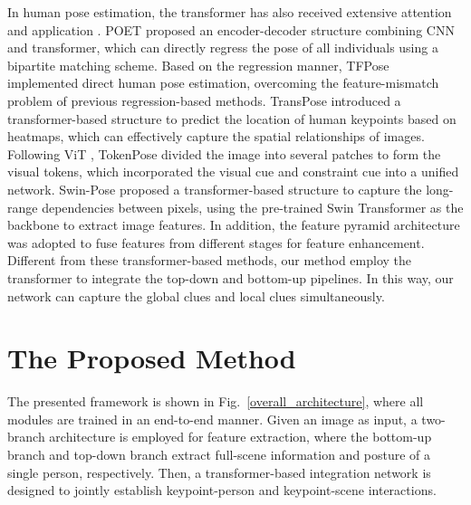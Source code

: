 \documentclass[runningheads]{llncs}
\begin{document}
In human pose estimation, the transformer has also received extensive attention and application \cite{POET2021,Tfpose2021,Transpose2021,Tokenpose2021,Swinpose2022}. POET \cite{POET2021} proposed an encoder-decoder structure combining CNN and transformer, which can directly regress the pose of all individuals using a bipartite matching scheme. Based on the regression manner, TFPose \cite{Tfpose2021} implemented direct human pose estimation, overcoming the feature-mismatch problem of previous regression-based methods. TransPose \cite{Transpose2021} introduced a transformer-based structure to predict the location of human keypoints based on heatmaps, which can effectively capture the spatial relationships of images. Following ViT \cite{VIT2020}, TokenPose \cite{Tokenpose2021} divided the image into several patches to form the visual tokens, which incorporated the visual cue and constraint cue into a unified network.
Swin-Pose \cite{Swinpose2022} proposed a transformer-based structure to capture the long-range dependencies between pixels, using the pre-trained Swin Transformer \cite{swin-transformer2021} as the backbone to extract image features. In addition, the feature pyramid architecture was adopted to fuse features from different stages for feature enhancement. Different from these transformer-based methods, our method employ the transformer to integrate the top-down and bottom-up pipelines. In this way, our network can capture the global clues and local clues simultaneously. 
\section{The Proposed Method} \label{sec:Method}
The presented framework is shown in Fig.~\ref{overall_architecture}, where all modules are trained in an end-to-end manner. Given an image as input, a two-branch architecture is employed for feature extraction, where the bottom-up branch and top-down branch extract full-scene information and posture of a single person, respectively. Then, a transformer-based integration network is designed to jointly establish keypoint-person and keypoint-scene interactions.
\end{document}
